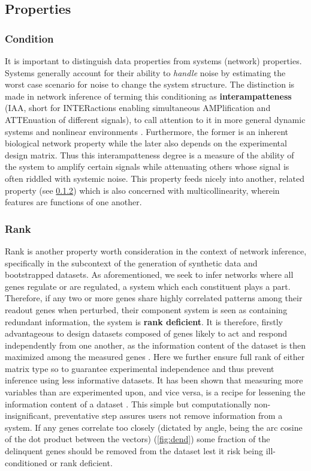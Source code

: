 \subsection{Properties}
\label{sec:prop}
\subsubsection{Condition}
\label{sec:cond}
It is important to distinguish data properties from systems (network) properties. Systems generally account for their ability to \emph{handle} noise by estimating the worst case scenario for noise to change the system structure. The distinction is made in network inference of terming this conditioning as \textbf{interampatteness} (IAA, short for INTERactions enabling simultaneous AMPlification and ATTEnuation of different signals), to call attention to it in more general dynamic systems and nonlinear environments \citep{nordling2009interampatteness}. Furthermore, the former is an inherent biological network property while the later also depends on the experimental design matrix.  Thus this interampatteness degree is a measure of the ability of the system to amplify certain signals while attenuating others whose signal is often riddled with systemic noise. This property feeds nicely into another, related property (see \cref{sec:rank}) which is also concerned with multicollinearity, wherein features are functions of one another.

\subsubsection{Rank}
\label{sec:rank}
Rank is another property worth consideration in the context of network inference, specifically in the subcontext of the generation of synthetic data and bootstrapped datasets. As aforementioned, we seek to infer networks where all genes regulate or are regulated, \ie a system which each constituent plays a part. Therefore, if any two or more genes share highly correlated patterns among their readout genes when perturbed, their component system is seen as containing redundant information, \ie the system is \textbf{rank deficient}. It is therefore, firstly advantageous to design datasets composed of genes likely to act and respond independently from one another, as the information content of the dataset is then maximized among the measured genes \citep{subramanian2017next}. Here we further ensure full rank of either matrix type so to guarantee experimental independence and thus prevent inference using less informative datasets. It has been shown that measuring more variables than are experimented upon, and vice versa, is a recipe for lessening the information content of a dataset \citep{Nordling2013}. This simple but computationally non-insignificant, preventative step assures users not remove information from a system.  If any genes correlate too closely (dictated by angle, being the arc cosine of the dot product between the vectors) (\cref{fig:dend}) some fraction of the delinquent genes should be removed from the dataset lest it risk being ill-conditioned or rank deficient.

